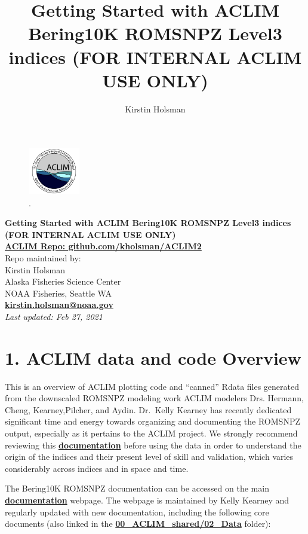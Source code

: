 \documentclass[
]{article}
\title{Getting Started with ACLIM Bering10K ROMSNPZ Level3 indices (FOR
INTERNAL ACLIM USE ONLY)}
\author{Kirstin Holsman}
\date{}
\begin{document}
\maketitle

{
\setcounter{tocdepth}{2}
\tableofcontents
}
\begin{figure}
\centering
\includegraphics[width=0.2\textwidth,height=\textheight]{Figs/ACLIM_logo.jpg}
\caption{.}
\end{figure}

\textbf{Getting Started with ACLIM Bering10K ROMSNPZ Level3 indices}\\
\textbf{(FOR INTERNAL ACLIM USE ONLY)}\\
\href{https://github.com/kholsman/ACLIM2}{\textbf{ACLIM Repo:
github.com/kholsman/ACLIM2}}\\
Repo maintained by:\\
Kirstin Holsman\\
Alaska Fisheries Science Center\\
NOAA Fisheries, Seattle WA\\
\textbf{\url{kirstin.holsman@noaa.gov}}~\\
\emph{Last updated: Feb 27, 2021}

\hypertarget{aclim-data-and-code-overview}{%
\section{1. ACLIM data and code
Overview}\label{aclim-data-and-code-overview}}

This is an overview of ACLIM plotting code and ``canned'' Rdata files
generated from the downscaled ROMSNPZ modeling work ACLIM modelers Drs.
Hermann, Cheng, Kearney,Pilcher, and Aydin. Dr.~Kelly Kearney has
recently dedicated significant time and energy towards organizing and
documenting the ROMSNPZ output, especially as it pertains to the ACLIM
project. We strongly recommend reviewing this
\href{https://beringnpz.github.io/roms-bering-sea/B10K-dataset-docs/}{\textbf{documentation}}
before using the data in order to understand the origin of the indices
and their present level of skill and validation, which varies
considerably across indices and in space and time.

The Bering10K ROMSNPZ documentation can be accessed on the main
\href{https://beringnpz.github.io/roms-bering-sea/B10K-dataset-docs/}{\textbf{documentation}}
webpage. The webpage is maintained by Kelly Kearney and regularly
updated with new documentation, including the following core documents
(also linked in the
\href{https://drive.google.com/drive/u/0/folders/0Bx7wdZllbuF9eDJndkhCS2EwQUk}{\textbf{00\_ACLIM\_shared/02\_Data}}
folder):
\end{document}
